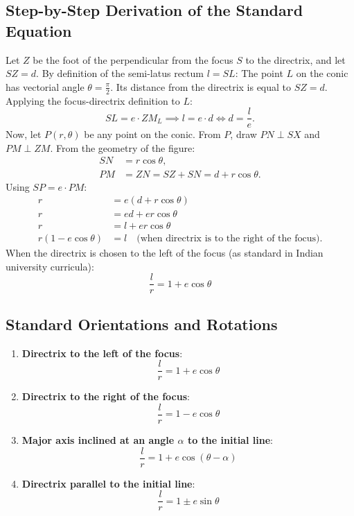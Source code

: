 \subsection{Step-by-Step Derivation of the Standard Equation}
Let $Z$ be the foot of the perpendicular from the focus $S$ to the directrix, and let $SZ = d$.
By definition of the semi-latus rectum $l = SL$:
The point $L$ on the conic has vectorial angle $\theta = \frac{\pi}{2}$. Its distance from the directrix is equal to $SZ = d$.
Applying the focus-directrix definition to $L$:
\begin{equation}
    SL = e \cdot ZM_L \implies l = e \cdot d \iff d = \frac{l}{e}.
\end{equation}
Now, let $P(r, \theta)$ be any point on the conic. From $P$, draw $PN \perp SX$ and $PM \perp ZM$.
From the geometry of the figure:
\begin{align}
    SN &= r\cos\theta, \\
    PM &= ZN = SZ + SN = d + r\cos\theta.
\end{align}
Using $SP = e \cdot PM$:
\begin{align}
    r &= e(d + r\cos\theta) \nonumber\\
    r &= ed + er\cos\theta \nonumber\\
    r &= l + er\cos\theta \nonumber\\
    r(1 - e\cos\theta) &= l \quad \text{(when directrix is to the right of the focus)}.
\end{align}
When the directrix is chosen to the left of the focus (as standard in Indian university curricula):
\begin{equation}
    \boxed{\frac{l}{r} = 1 + e\cos\theta}
\end{equation}

\subsection{Standard Orientations and Rotations}
\begin{theorembox}
\begin{enumerate}
    \item \textbf{Directrix to the left of the focus}:
    \begin{equation}
        \frac{l}{r} = 1 + e\cos\theta
    \end{equation}
    \item \textbf{Directrix to the right of the focus}:
    \begin{equation}
        \frac{l}{r} = 1 - e\cos\theta
    \end{equation}
    \item \textbf{Major axis inclined at an angle $\alpha$ to the initial line}:
    \begin{equation}
        \frac{l}{r} = 1 + e\cos(\theta - \alpha)
    \end{equation}
    \item \textbf{Directrix parallel to the initial line}:
    \begin{equation}
        \frac{l}{r} = 1 \pm e\sin\theta
    \end{equation}
\end{enumerate}
\end{theorembox}

